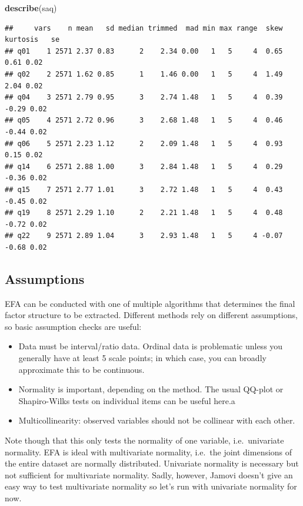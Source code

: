 \documentclass[
]{book}
\newenvironment{Shaded}{\begin{snugshade}}{\end{snugshade}}
\newcommand{\FunctionTok}[1]{\textcolor[rgb]{0.13,0.29,0.53}{\textbf{#1}}}
\newcommand{\NormalTok}[1]{#1}
\providecommand{\tightlist}{%
  \setlength{\itemsep}{0pt}\setlength{\parskip}{0pt}}
\begin{document}
\begin{Shaded}
\begin{Highlighting}[]
\FunctionTok{describe}\NormalTok{(saq)}
\end{Highlighting}
\end{Shaded}

\begin{verbatim}
##     vars    n mean   sd median trimmed  mad min max range  skew kurtosis   se
## q01    1 2571 2.37 0.83      2    2.34 0.00   1   5     4  0.65     0.61 0.02
## q02    2 2571 1.62 0.85      1    1.46 0.00   1   5     4  1.49     2.04 0.02
## q04    3 2571 2.79 0.95      3    2.74 1.48   1   5     4  0.39    -0.29 0.02
## q05    4 2571 2.72 0.96      3    2.68 1.48   1   5     4  0.46    -0.44 0.02
## q06    5 2571 2.23 1.12      2    2.09 1.48   1   5     4  0.93     0.15 0.02
## q14    6 2571 2.88 1.00      3    2.84 1.48   1   5     4  0.29    -0.36 0.02
## q15    7 2571 2.77 1.01      3    2.72 1.48   1   5     4  0.43    -0.45 0.02
## q19    8 2571 2.29 1.10      2    2.21 1.48   1   5     4  0.48    -0.72 0.02
## q22    9 2571 2.89 1.04      3    2.93 1.48   1   5     4 -0.07    -0.68 0.02
\end{verbatim}

\hypertarget{assumptions-4}{%
\subsection{Assumptions}\label{assumptions-4}}

EFA can be conducted with one of multiple algorithms that determines the final factor structure to be extracted. Different methods rely on different assumptions, so basic assumption checks are useful:

\begin{itemize}
\tightlist
\item
  Data must be interval/ratio data. Ordinal data is problematic unless you generally have at least 5 scale points; in which case, you can broadly approximate this to be continuous.
\item
  Normality is important, depending on the method. The usual QQ-plot or Shapiro-Wilks tests on individual items can be useful here.a
\item
  Multicollinearity: observed variables should not be collinear with each other.
\end{itemize}

Note though that this only tests the normality of one variable, i.e.~univariate normality. EFA is ideal with multivariate normality, i.e.~the joint dimensions of the entire dataset are normally distributed. Univariate normality is necessary but not sufficient for multivariate normality. Sadly, however, Jamovi doesn't give an easy way to test multivariate normality so let's run with univariate normality for now.
\end{document}
